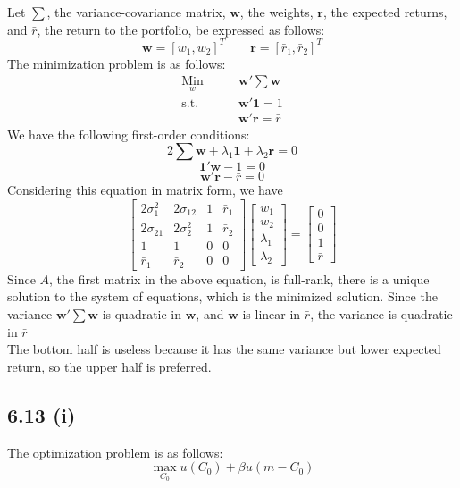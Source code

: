 \documentclass[letterpaper,12pt]{article}
\theoremstyle{definition}
\begin{document}
Let $\displaystyle\sum$, the variance-covariance matrix, $\mathbf{w}$, the weights, $\mathbf{r}$, the expected returns, and $\bar{r}$, the return to the portfolio, be expressed as follows:
\[ \mathbf{w} = [w_1,w_2]^T \qquad \mathbf{r} = [\bar{r}_1,\bar{r}_2]^T\]
The minimization problem is as follows:
\begin{align*}
    \underset{w}{\text{Min}} \qquad&\mathbf{w}'\displaystyle\sum \mathbf{w}\\
    \text{s.t.}\qquad  &\mathbf{w}'\mathbf{1} = 1 \\ &\mathbf{w}'\mathbf{r} = \bar{r}
\end{align*}
We have the following first-order conditions:
\[ 2\displaystyle\sum \mathbf{w} + \lambda_1 \mathbf{1} + \lambda_2 \mathbf{r} = 0\]
\[\mathbf{1}' \mathbf{w} - 1 = 0\]
\[\mathbf{w}' \mathbf{r} - \bar{r} = 0\]
Considering this equation in matrix form, we have
\[\begin{bmatrix}
    2\sigma_1^2 & 2\sigma_{12} & 1 & \bar{r}_1 \\
    2\sigma_{21} & 2\sigma_2^2 & 1 & \bar{r}_2 \\
    1 & 1 & 0 & 0 \\
    \bar{r}_1 & \bar{r}_2 & 0 & 0
\end{bmatrix}
\begin{bmatrix}
w_1\\
w_2\\
\lambda_1\\
\lambda_2
\end{bmatrix}
=
\begin{bmatrix}
0\\
0\\
1\\
\bar{r}
\end{bmatrix}
\]
Since $A$, the first matrix in the above equation, is full-rank, there is a unique solution to the system of equations, which is the minimized solution. Since the variance $\mathbf{w}'\displaystyle\sum \mathbf{w}$ is quadratic in $\mathbf{w}$, and $\mathbf{w}$ is linear in $\bar{r}$, the variance is quadratic in $\bar{r}$
\\ The bottom half is useless because it has the same variance but lower expected return, so the upper half is preferred.

\subsection*{6.13 (i)}

The optimization problem is as follows:\\
\[\displaystyle \max_{C_0} u(C_0) + \beta u(m-C_0)\]
\end{document}
